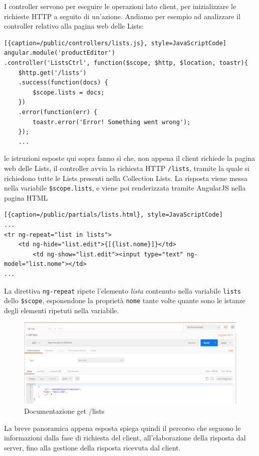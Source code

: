 I controller servono per eseguire le operazioni lato client, per inizializzare le richieste HTTP a seguito di un'azione. Andiamo per esempio ad analizzare il controller relativo alla pagina web delle Lists:
\begin{lstlisting}[{caption=/public/controllers/lists.js}, style=JavaScriptCode]
angular.module('productEditor')
.controller('ListsCtrl', function($scope, $http, $location, toastr){
	$http.get('/lists')
	.success(function(docs) {
		$scope.lists = docs;
	})
	.error(function(err) {
		toastr.error('Error! Something went wrong');
	});
	...
\end{lstlisting}
le istruzioni esposte qui sopra fanno sì che, non appena il client richiede la pagina web delle Lists, il controller avvia la richiesta HTTP \texttt{/lists}, tramite la quale si richiedono tutte le Lists presenti nella Collection Lists. La risposta viene messa nella variabile \texttt{\$scope.lists}, e viene poi renderizzata tramite AngularJS nella pagina HTML
\begin{lstlisting}[{caption=/public/partials/lists.html}, style=JavaScriptCode]
...
<tr ng-repeat="list in lists">
	<td ng-hide="list.edit">{[{list.nome}]}</td>
		<td ng-show="list.edit"><input type="text" ng-model="list.nome"></td>
...
\end{lstlisting}
La direttiva \texttt{ng-repeat} ripete l'elemento \emph{lista} contenuto nella variabile \texttt{lists} dello \texttt{\$scope}, esponendone la proprietà \texttt{nome} tante volte quante sono le istanze degli elementi ripetuti nella variabile.
\begin{figure}[h]
	\centering
	\includegraphics[scale=0.42]{Immagini/get_lists.png}
	\caption{Documentazione get /lists}
\end{figure}

La breve panoramica appena esposta spiega quindi il percorso che seguono le informazioni dalla fase di richiesta del client, all'elaborazione della risposta dal server, fino alla gestione della risposta ricevuta dal client.

